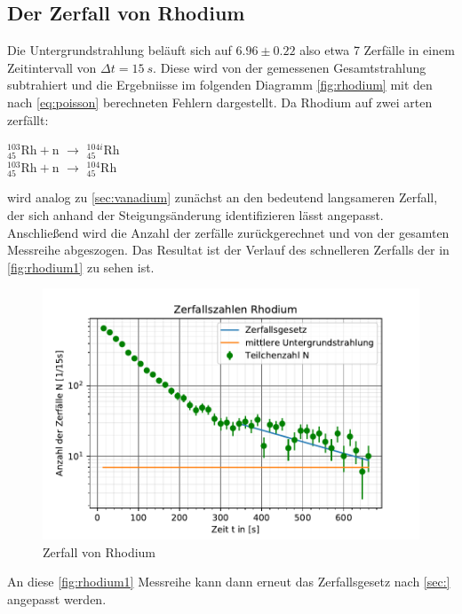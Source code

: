 \subsection{Der Zerfall von Rhodium}
Die Untergrundstrahlung beläuft sich auf  $6.96 \pm 0.22$ also etwa 7 Zerfälle in einem Zeitintervall
von $\Delta t =\SI{15}{s}$. Diese wird von der gemessenen Gesamtstrahlung subtrahiert und die Ergebniisse
im folgenden Diagramm \autoref{fig:rhodium} mit den nach \autoref{eq:poisson} berechneten Fehlern dargestellt.
Da Rhodium auf zwei arten zerfällt: 
\begin{center} 
    $^{103}_{45}\mathrm{Rh} + \mathrm{n}$ $\rightarrow$ $^{104i}_{45}\mathrm{Rh}$\\
    $^{103}_{45}\mathrm{Rh} + \mathrm{n}$ $\rightarrow$ $^{104}_{45}\mathrm{Rh}$
\end{center}
wird analog zu \autoref{sec:vanadium} zunächst an den bedeutend langsameren Zerfall, der sich anhand der 
Steigungsänderung identifizieren lässt angepasst. Anschließend wird die Anzahl der zerfälle zurückgerechnet und 
von der gesamten Messreihe abgeszogen. Das Resultat ist der Verlauf des schnelleren Zerfalls der in 
\autoref{fig:rhodium1} zu sehen ist. 
  \begin{figure}
    \centering
    \includegraphics{rhodium.pdf}
    \caption{Zerfall von Rhodium}
    \label{fig:rhodium}
  \end{figure}
An diese \autoref{fig:rhodium1} Messreihe kann dann erneut das Zerfallsgesetz nach \autoref{sec:} angepasst 
werden. 
